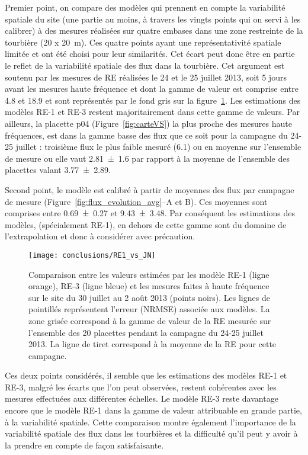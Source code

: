 Premier point, on compare des modèles qui prennent en compte la variabilité spatiale du site (une partie au moins, à travers les vingts points qui on servi à les calibrer) à des mesures réalisées sur quatre embases dans une zone restreinte de la tourbière (20 x \SI{20}{\metre}).
Ces quatre points ayant une représentativité spatiale limitée et ont été choisi pour leur similarités.
Cet écart peut donc être en partie le reflet de la variabilité spatiale des flux dans la tourbière.
Cet argument est soutenu par les mesures de RE réalisées le 24 et le 25 juillet 2013, soit 5 jours avant les mesures haute fréquence et dont la gamme de valeur est comprise entre \num{4.8} et \SI{18.9}{\uml} et sont représentés par le fond gris sur la figure~\ref{fig:RE1_vs_JN}.
Les estimations des modèles RE-1 et RE-3 restent majoritairement dans cette gamme de valeurs.
Par ailleurs, la placette p04 (Figure~\ref{fig:carteVS}) la plus proche des mesures haute fréquences, est dans la gamme basse des flux que ce soit pour la campagne du 24-25 juillet : troisième flux le plus faible mesuré (\SI{6.1}{\uml}) ou en moyenne sur l'ensemble de mesure ou elle vaut \SI{2.81(160)}{\uml} par rapport à la moyenne de l'ensemble des placettes valant \SI{3.77(289)}{\uml}.

Second point, le modèle est calibré à partir de moyennes des flux par campagne de mesure (Figure~\ref{fig:flux_evolution_avg}--A et B).
Ces moyennes sont comprises entre \num{0.69(027)} et \SI{9.43(348)}{\uml}.
Par conséquent les estimations des modèles, (spécialement RE-1), en dehors de cette gamme sont du domaine de l'extrapolation et donc à considérer avec précaution.

\begin{figure}
\centering
\texttt{[image: conclusions/RE1\_vs\_JN]}
\caption{Comparaison entre les valeurs estimées par les modèle RE-1 (ligne orange), RE-3 (ligne bleue) et les mesures faites à haute fréquence sur le site du 30 juillet au 2 août 2013 (points noirs). Les lignes de pointillés représentent l'erreur (NRMSE) associée aux modèles. La zone grisée correspond à la gamme de valeur de la RE mesurée sur l'ensemble des 20 placettes pendant la campagne du 24-25 juillet 2013. La ligne de tiret correspond à la moyenne de la RE pour cette campagne.}
\label{fig:RE1_vs_JN}
\end{figure}

Ces deux points considérés, il semble que les estimations des modèles RE-1 et RE-3, malgré les écarts que l'on peut observées, restent cohérentes avec les mesures effectuées aux différentes échelles.
Le modèle RE-3 reste davantage encore que le modèle RE-1 dans la gamme de valeur attribuable en grande partie, à la variabilité spatiale.
Cette comparaison montre également l'importance de la variabilité spatiale des flux dans les tourbières et la difficulté qu'il peut y avoir à la prendre en compte de façon satisfaisante.



